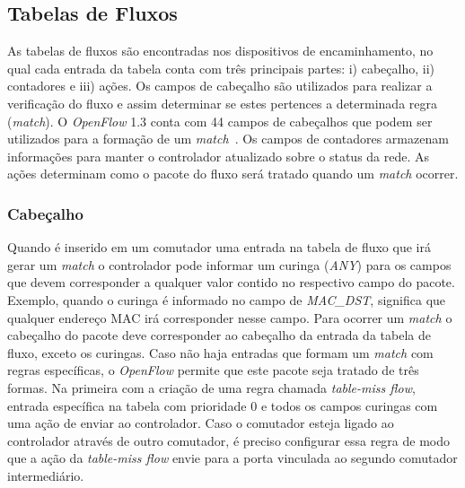 \subsection{Tabelas de Fluxos}
\label{sub:tabelas}
As tabelas de fluxos são encontradas nos dispositivos de encaminhamento, no qual cada entrada da tabela conta com três principais partes: i) cabeçalho, ii) contadores e iii) ações. Os campos de cabeçalho são utilizados para realizar a verificação do fluxo e assim determinar se estes pertences a determinada regra (\textit{match}). O \textit{OpenFlow} 1.3 conta com 44 campos de cabeçalhos que podem ser utilizados para a formação de um \textit{match}~\cite{nygren2015openflow}. Os campos de contadores armazenam informações para manter o controlador atualizado sobre o status da rede. As ações determinam como o pacote do fluxo será tratado quando um \textit{match} ocorrer. 

\subsubsection{Cabeçalho}
Quando é inserido em um comutador uma entrada na tabela de fluxo que irá gerar um \textit{match} o controlador pode informar um curinga (\textit{ANY}) para os campos que devem corresponder a qualquer valor contido no respectivo campo do pacote. Exemplo, quando o curinga é informado no campo de \textit{MAC\_DST}, significa que qualquer endereço MAC irá corresponder nesse campo. Para ocorrer um \textit{match} o cabeçalho do pacote deve corresponder ao cabeçalho da entrada da tabela de fluxo, exceto os curingas. Caso não haja entradas que formam um \textit{match} com regras específicas, o \textit{OpenFlow} permite que este pacote seja tratado de três formas. Na primeira com a criação de uma regra chamada \textit{table-miss flow}, entrada específica na tabela com prioridade 0 e todos os campos curingas com uma ação de enviar ao controlador. Caso o comutador esteja ligado ao controlador através de outro comutador, é preciso configurar essa regra de modo que a ação da \textit{table-miss flow} envie para a porta vinculada ao segundo comutador intermediário.

